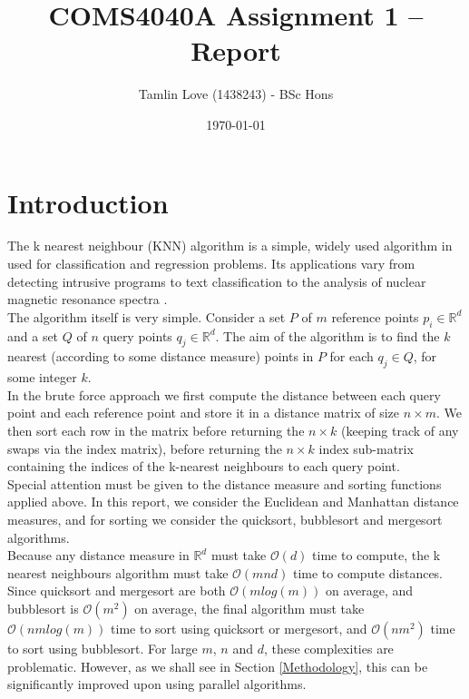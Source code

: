 \documentclass[10pt]{article}
\begin{document}
\title{COMS4040A Assignment 1 -- Report}
\author{Tamlin Love (1438243) - BSc Hons}
\date{\today} 
\maketitle 
\pagestyle{fancy}
\fancyhf{}
\fancyhead[R]{\thepage}
{} 
\vspace{-1.5cm}
\section{Introduction}\label{Introduction}
The k nearest neighbour (KNN) algorithm is a simple, widely used algorithm in used for classification and regression problems\cite{altman92}. Its applications vary from detecting intrusive programs\cite{liao02} to text classification \cite{kwon03} to the analysis of nuclear magnetic resonance spectra \cite{kowalski72}.
\\
The algorithm itself is very simple. Consider a set $P$ of $m$ reference points $p_{i}\in\mathbb{R}^{d}$ and a set $Q$ of $n$ query points $q_{j} \in \mathbb{R}^{d}$. The aim of the algorithm is to find the $k$ nearest (according to some distance measure) points in $P$ for each $q_{j}\in Q$, for some integer $k$.
\\
In the brute force approach we first compute the distance between each query point and each reference point and store it in a distance matrix of size $n \times m$. We then sort each row in the matrix before returning the $n \times k$ (keeping track of any swaps via the index matrix), before returning the $n \times k$ index sub-matrix containing the indices of the k-nearest neighbours to each query point.
\\
Special attention must be given to the distance measure and sorting functions applied above. In this report, we consider the Euclidean and Manhattan distance measures, and for sorting we consider the quicksort, bubblesort and mergesort algorithms.
\\
Because any distance measure in $\mathbb{R}^{d}$ must take $\mathcal{O}(d)$ time to compute, the k nearest neighbours algorithm must take $\mathcal{O}(mnd)$ time to compute distances. Since quicksort and mergesort are both $\mathcal{O}(mlog(m))$ on average, and bubblesort is $\mathcal{O}(m^2)$ on average, the final algorithm must take $\mathcal{O}(nmlog(m))$ time to sort using quicksort or mergesort, and $\mathcal{O}(nm^2)$ time to sort using bubblesort. For large $m$, $n$ and $d$, these complexities are problematic. However, as we shall see in Section \ref{Methodology}, this can be significantly improved upon using parallel algorithms.
\end{document}
